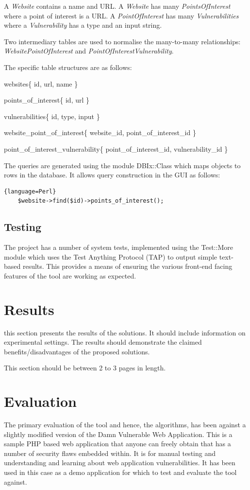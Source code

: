 \documentclass[12pt,a4paper]{article}
\begin{document}
A \emph{Website} contains a name and URL.
A \emph{Website} has many \emph{PointsOfInterest} where a point of interest is a URL.
A \emph{PointOfInterest} has many \emph{Vulnerabilities} where a \emph{Vulnerability} has a type and an input string.

Two intermediary tables are used to normalise the many-to-many relationships: \emph{WebsitePointOfInterest} and \emph{PointOfInterestVulnerability}.

The specific table structures are as follows:

websites\{ id, url, name \}

points\_of\_interest\{ id, url \}

vulnerabilities\{ id, type, input \}

website\_point\_of\_interest\{ website\_id, point\_of\_interest\_id \}

point\_of\_interest\_vulnerability\{ point\_of\_interest\_id, vulnerability\_id \}

The queries are generated using the module DBIx::Class which maps objects to rows in the database.  It allows query construction in the GUI as follows:

\begin{lstlisting}{language=Perl}
    $website->find($id)->points_of_interest();
\end{lstlisting}

\subsection{Testing}
The project has a number of system tests, implemented using the Test::More module which uses the Test Anything Protocol (TAP) to output simple text-based results.  This provides a means of ensuring the various front-end facing features of the tool are working as expected.

\section{Results}

this section presents the results of the solutions.  It should include information on experimental settings.  The results should demonstrate the claimed benefits/disadvantages of the proposed solutions.

This section should be between 2 to 3 pages in length.

\section{Evaluation}
The primary evaluation of the tool and hence, the algorithms, has been against a slightly modified version of the Damn Vulnerable Web Application.  This is a sample PHP based web application that anyone can freely obtain that has a number of security flaws embedded within.  It is for manual testing and understanding and learning about web application vulnerabilities.  It has been used in this case as a demo application for which to test and evaluate the tool against.
\end{document}
